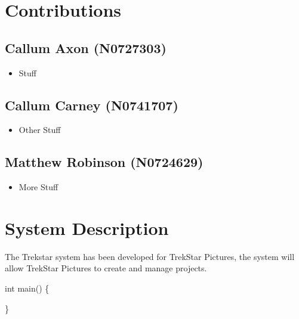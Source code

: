 \documentclass[
  english,
  a4paper,
,tablecaptionabove
]{scrartcl}
\newenvironment{Shaded}{}{}
\newcommand{\DataTypeTok}[1]{\textcolor[rgb]{0.56,0.13,0.00}{#1}}
\newcommand{\NormalTok}[1]{#1}
\providecommand{\tightlist}{%
  \setlength{\itemsep}{0pt}\setlength{\parskip}{0pt}}
\begin{document}
\newpage

\hypertarget{contributions}{%
\section{Contributions}\label{contributions}}

\hypertarget{callum-axon-n0727303}{%
\subsection{Callum Axon (N0727303)}\label{callum-axon-n0727303}}

\begin{itemize}
\tightlist
\item
  Stuff
\end{itemize}

\hypertarget{callum-carney-n0741707}{%
\subsection{Callum Carney (N0741707)}\label{callum-carney-n0741707}}

\begin{itemize}
\tightlist
\item
  Other Stuff
\end{itemize}

\hypertarget{matthew-robinson-n0724629}{%
\subsection{Matthew Robinson
(N0724629)}\label{matthew-robinson-n0724629}}

\begin{itemize}
\tightlist
\item
  More Stuff
\end{itemize}

\newpage

\hypertarget{system-description}{%
\section{System Description}\label{system-description}}

The Trekstar system has been developed for TrekStar Pictures, the system
will allow TrekStar Pictures to create and manage projects.

\begin{Shaded}
\begin{Highlighting}[]
\DataTypeTok{int}\NormalTok{ main() \{}

\NormalTok{\}}
\end{Highlighting}
\end{Shaded}
\end{document}
